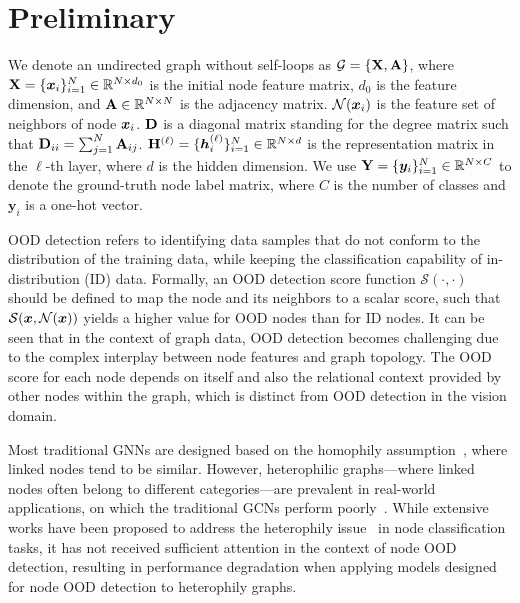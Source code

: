 \section{Preliminary}
\vspace{-3mm}
We denote an undirected graph without self-loops as $\mathcal{G}=\{ \mathbf{X}, \mathbf{A} \}$, 
where $\mathbf{X}=\{ \bm{x}_i \}_{i=1}^N\in\mathbb{R}^{N\times d_0}$ is the initial node feature matrix, $d_0$ is the feature dimension, 
and $\mathbf{A}\in\mathbb{R}^{N\times N}$ is the adjacency matrix. 
$\mathcal{N}({\bm{x}}_i)$ is the feature set of neighbors of node ${\bm{x}}_i$. 
$\mathbf{D}$ is a diagonal matrix standing for the degree matrix such that $\mathbf{D}_{ii}=\sum_{j=1}^N\mathbf{A}_{ij}$. 
$\mathbf{H}^{(\ell)}=\{\bm{h}_i^{(\ell)}\}_{i=1}^N \in \mathbb{R}^{N \times d}$ is the representation matrix in the $\ell$-th layer, where $d$ is the hidden dimension. 
We use $\mathbf{Y}=\{ {\bm{y}}_i \}_{i=1}^N\in\mathbb{R}^{N\times C}$ to denote the ground-truth node label matrix, where $C$ is the number of classes and $\bm{y}_i$ is a one-hot vector.


OOD detection refers to identifying data samples that do not conform to the distribution of the training data, while keeping the classification capability of in-distribution (ID) data. Formally, an OOD detection score function $\mathcal{S}(\cdot,\cdot)$ should be defined to map the node and its neighbors to a scalar score, such that $\mathcal{S}({\bm{x}},\mathcal{N}({\bm{x}}))$ yields a higher value for OOD nodes than for ID nodes. 
It can be seen that in the context of graph data, OOD detection becomes challenging due to the complex interplay between node features and graph topology. 
The OOD score for each node depends on itself and also the relational context provided by other nodes within the graph, which is distinct from OOD detection in the vision domain.

Most traditional GNNs are designed based on the homophily assumption~\citep{kipf2016classification,GAT}, where linked nodes tend to be similar. However, heterophilic graphs—where linked nodes often belong to different categories—are prevalent in real-world applications, on which the traditional GCNs perform poorly~\citep{pei2020geom}. 
While extensive works have been proposed to address the heterophily issue~\citep{abu2019mixhop,fagcn2021,zhu2020beyond,gprgnn,li2022finding,lsgnn,fgsam} in node classification tasks, it has not received sufficient attention in the context of node OOD detection, resulting in performance degradation when applying models designed for node OOD detection to heterophily graphs. 

